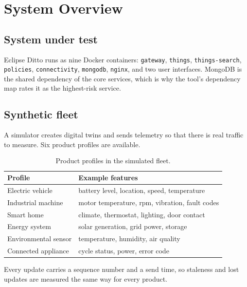 \documentclass[11pt,a4paper]{article}
\begin{document}
\section{System Overview}

\subsection{System under test}

Eclipse Ditto runs as nine Docker containers: \texttt{gateway},
\texttt{things}, \texttt{things-search}, \texttt{policies},
\texttt{connectivity}, \texttt{mongodb}, \texttt{nginx}, and two user
interfaces. MongoDB is the shared dependency of the core services, which is
why the tool's dependency map rates it as the highest-risk service.

\subsection{Synthetic fleet}

A simulator creates digital twins and sends telemetry so that there is real
traffic to measure. Six product profiles are available.

\begin{table}[h]
\centering
\begin{tabularx}{\textwidth}{@{}lL@{}}
\toprule
\textbf{Profile} & \textbf{Example features} \\
\midrule
Electric vehicle & battery level, location, speed, temperature \\
Industrial machine & motor temperature, rpm, vibration, fault codes \\
Smart home & climate, thermostat, lighting, door contact \\
Energy system & solar generation, grid power, storage \\
Environmental sensor & temperature, humidity, air quality \\
Connected appliance & cycle status, power, error code \\
\bottomrule
\end{tabularx}
\caption{Product profiles in the simulated fleet.}
\end{table}

Every update carries a sequence number and a send time, so staleness and lost
updates are measured the same way for every product.

\end{document}
